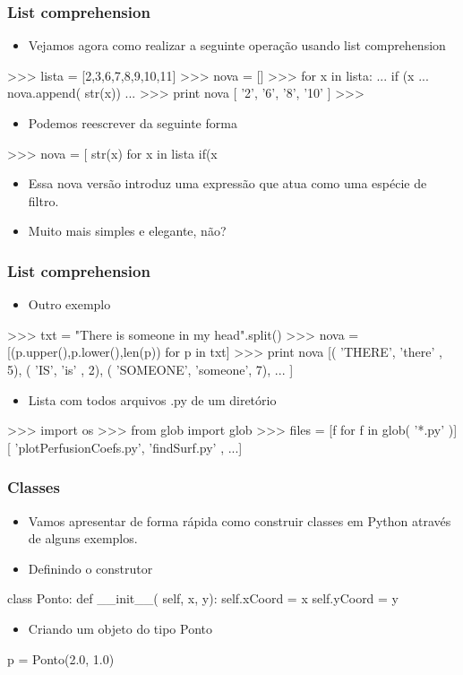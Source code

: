 \documentclass[12pt,t,graphics]{beamer}
\newcommand{\ft}[1]{\frametitle{#1}}
\newcommand{\bi}{\begin{itemize}}
\newcommand{\ei}{\end{itemize}}
\begin{document}

\begin{frame}[fragile]
  \ft{List comprehension}
  \bi
\item Vejamos agora como realizar a seguinte operação
  usando list comprehension
  \ei
  \begin{python}
>>> lista = [2,3,6,7,8,9,10,11]
>>> nova = []
>>> for x in lista:
...     if (x%
...         nova.append( str(x))
...
>>> print nova
[ '2', '6', '8', '10' ]
>>>	
  \end{python}
  \bi
\item Podemos reescrever da seguinte forma
  \ei
  \begin{python}
>>> nova = [ str(x) for x in lista if(x%
  \end{python}
  \bi
\item Essa nova versão introduz uma expressão que atua
  como uma espécie de filtro.
\item Muito mais simples e elegante, não?
  \ei	
\end{frame}


\begin{frame}[fragile]
  \ft{List comprehension}
  \bi
\item Outro exemplo
  \ei
  \begin{python}
>>> txt = "There is someone in my head".split()
>>> nova = [(p.upper(),p.lower(),len(p)) for p in txt]
>>> print nova
[( 'THERE', 'there' , 5),
( 'IS', 'is' , 2),
( 'SOMEONE', 'someone', 7),
...
]	
  \end{python}	
  \bi
\item Lista com todos arquivos .py de um diretório
  \ei
  \begin{python}
>>> import os
>>> from glob import glob
>>> files = [f for f in glob( '*.py' )]
[ 'plotPerfusionCoefs.py', 'findSurf.py' , ...]	
  \end{python}		
\end{frame}


\begin{frame}[fragile]
   \ft{Classes}
  \bi
\item Vamos apresentar de forma rápida como construir
  classes em Python através de alguns exemplos.
\ei
  \bi
\item Definindo o construtor
  \ei
  \begin{python}
 class Ponto:
    def __init__( self, x, y):
        self.xCoord = x
        self.yCoord = y		
  \end{python}
  \bi
\item Criando um objeto do tipo Ponto
  \ei
  \begin{python}
p = Ponto(2.0, 1.0)
  \end{python}	
\end{frame}
\end{document}
